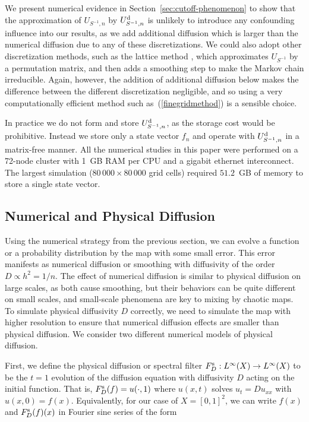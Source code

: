 \documentclass{aims}
\theoremstyle{definition}
\begin{document}
We present numerical evidence in Section~\ref{sec:cutoff-phenomenon}
to show that the approximation of $U_{S^{-1},n}$ by $U_{S^{-1},n}^{\rm
  d}$ is unlikely to introduce any confounding influence into our
results, as we add additional diffusion which is larger than the
numerical diffusion due to any of these discretizations. We could also
adopt other discretization methods, such as the lattice method
\cite{Pierrehumbert2000}, which approximates $U_{S^{-1}}$ by a
permutation matrix, and then adds a smoothing step to make the Markov
chain irreducible. Again, however, the addition of additional
diffusion below makes the difference between the different
discretization negligible, and so using a very computationally
efficient method such as~(\ref{finegridmethod}) is a sensible choice.

In practice we do not form and store $U_{S^{-1},n}^{\rm d}$, as the
storage cost would be prohibitive. Instead we store only a state
vector $f_n$ and operate with $U_{S^{-1},n}^{\rm d}$ in a matrix-free
manner. All the numerical studies in this paper were performed on a
72-node cluster with 1~GB RAM per CPU and a gigabit ethernet
interconnect. The largest simulation ($80\,000 \times 80\,000$ grid
cells) required $51.2$~GB of memory to store a single state vector.

\subsection{Numerical and Physical Diffusion}

Using the numerical strategy from the previous section, we can evolve
a function or a probability distribution by the map with some small
error. This error manifests as numerical diffusion or smoothing with
diffusivity of the order $D \propto h^2 = 1/n$. The effect of
numerical diffusion is similar to physical diffusion on large scales,
as both cause smoothing, but their behaviors can be quite different on
small scales, and small-scale phenomena are key to mixing by chaotic
maps. To simulate physical diffusivity $D$ correctly, we need to
simulate the map with higher resolution to ensure that numerical
diffusion effects are smaller than physical diffusion. We consider two
different numerical models of physical diffusion.

First, we define the physical diffusion or spectral filter $F^{\rm
  s}_D : L^\infty(X) \to L^\infty(X)$ to be the $t=1$ evolution of the
diffusion equation with diffusivity $D$ acting on the initial
function. That is, $F^{\rm s}_D(f) = u(\cdot,1)$ where $u(x,t)$ solves
$u_{t} = D u_{xx}$ with $u(x,0) = f(x)$. Equivalently, for our case of
$X = [0,1]^2$, we can write $f(x)$ and $F^{\rm s}_D(f)(x)$ in Fourier
sine series of the form
\end{document}

